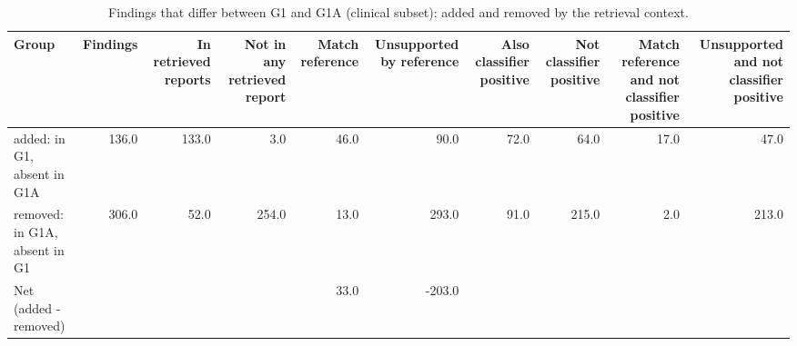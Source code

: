 \begin{table}[t]
\centering
\scriptsize
\begin{tabular}{lrrrrrrrrr}
\hline
Group & Findings & In retrieved reports & Not in any retrieved report & Match reference & Unsupported by reference & Also classifier positive & Not classifier positive & Match reference and not classifier positive & Unsupported and not classifier positive \\
\hline
added: in G1, absent in G1A & 136.0 & 133.0 & 3.0 & 46.0 & 90.0 & 72.0 & 64.0 & 17.0 & 47.0 \\
removed: in G1A, absent in G1 & 306.0 & 52.0 & 254.0 & 13.0 & 293.0 & 91.0 & 215.0 & 2.0 & 213.0 \\
Net (added - removed) &  &  &  & 33.0 & -203.0 &  &  &  &  \\
\hline
\end{tabular}
\caption{Findings that differ between G1 and G1A (clinical subset): added and removed by the retrieval context.}
\label{tab:table4_retrieval_induced_findings}
\end{table}
